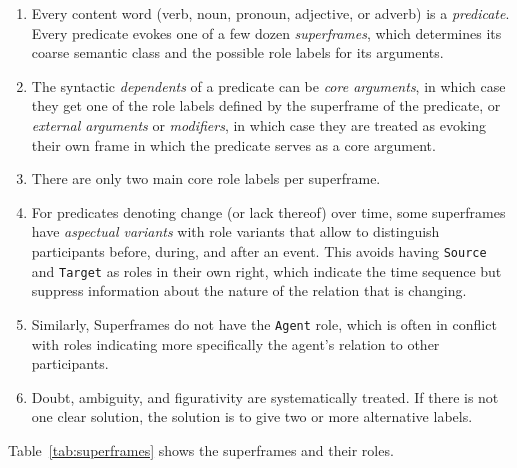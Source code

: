 \documentclass[a4paper]{article}
\begin{document}
\begin{enumerate}
    \item Every content word (verb, noun, pronoun, adjective, or adverb) is a
        \emph{predicate}. Every predicate evokes one of a few dozen
        \emph{superframes}, which determines its coarse semantic class and the
        possible role labels for its arguments.
    \item The syntactic \emph{dependents} of a predicate can be
        \emph{core arguments}, in which case they get one of the role labels
        defined by the superframe of the predicate, or \emph{external
        arguments} or \emph{modifiers}, in which case they are treated as
        evoking their own frame in which the predicate serves as a core argument.
    \item There are only two main core role labels per superframe.
    \item For predicates denoting change (or lack thereof) over time,
        some superframes have \emph{aspectual variants} with role variants that
        allow to distinguish participants before, during, and after an event.
        This avoids having \texttt{Source} and \texttt{Target} as roles in
        their own right, which indicate the time sequence but suppress
        information about the nature of the relation that is changing.
    \item Similarly, Superframes do not have the \texttt{Agent} role, which is
        often in conflict with roles indicating more specifically the agent's
        relation to other participants.
    \item Doubt, ambiguity, and figurativity are systematically treated. If there
        is not one clear solution, the solution is to give two or more
        alternative labels.
\end{enumerate}

Table~\ref{tab:superframes} shows the superframes and their roles.
\end{document}
